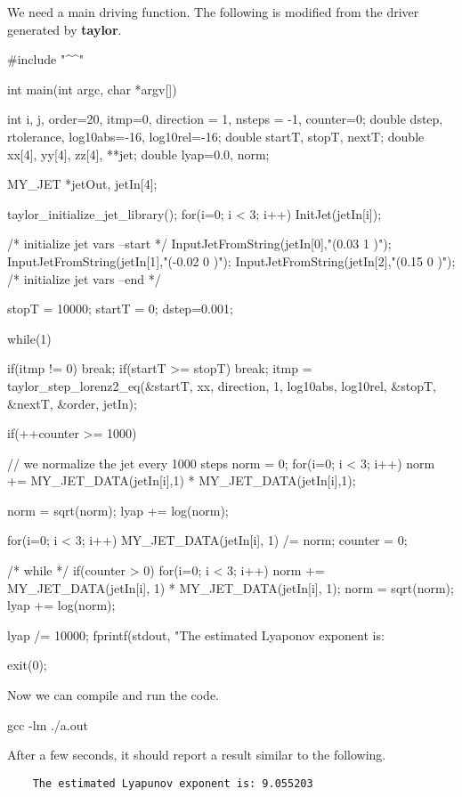 \documentclass[10pt]{article}
\theoremstyle{remark}
\newcommand{\taylorname}{{\bf taylor}}
\newcommand{\mainfile}{}
\newcommand{\odecfile}{}
\newcommand{\odehfile}{}
\begin{document}
\bigskip
We need a main driving function. The following is modified from the
driver generated by \taylorname{}.
\begin{code}[title={File: \mainfile{}}]
    #include "^\odehfile{}^"
    
    int main(int argc, char *argv[])
    {
      int     i, j, order=20, itmp=0, direction = 1, nsteps = -1, counter=0;
      double  dstep, rtolerance, log10abs=-16, log10rel=-16;
      double  startT, stopT, nextT;
      double  xx[4], yy[4], zz[4], **jet;
      double  lyap=0.0, norm;
    
      MY_JET    *jetOut, jetIn[4];
    
      taylor_initialize_jet_library();
      for(i=0; i < 3; i++) InitJet(jetIn[i]);
      
      /* initialize jet vars --start */
      InputJetFromString(jetIn[0],"(0.03  1 )");
      InputJetFromString(jetIn[1],"(-0.02 0 )");
      InputJetFromString(jetIn[2],"(0.15  0 )");
      /* initialize jet vars --end */
    
      stopT = 10000;
      startT = 0;
      dstep=0.001;
    
      while(1)  {
        if(itmp != 0) {break;}
        if(startT >= stopT) { break;}
        itmp = taylor_step_lorenz2_eq(&startT, xx, direction, 1, 
                                      log10abs, log10rel, 
                                      &stopT, &nextT, &order, jetIn);
    
        if(++counter >= 1000) {  // we normalize the jet every 1000 steps                                                                             
          norm = 0;
          for(i=0; i < 3; i++)  norm += MY_JET_DATA(jetIn[i],1) * MY_JET_DATA(jetIn[i],1);  
    
          norm = sqrt(norm);
          lyap += log(norm);
    
          for(i=0; i < 3; i++) MY_JET_DATA(jetIn[i], 1) /= norm;
          counter = 0;
        }
      }  /* while */
      if(counter > 0) {
        for(i=0; i < 3; i++) norm += MY_JET_DATA(jetIn[i], 1) *  MY_JET_DATA(jetIn[i], 1); 
        norm = sqrt(norm);
        lyap += log(norm);
      }
    
      lyap /= 10000;
      fprintf(stdout, "The estimated Lyaponov exponent is: %
    
      exit(0);
    }
\end{code}
Now we can compile and run the code.
\begin{command}
    gcc \mainfile{} \odecfile{} -lm
    ./a.out
\end{command}
After a few seconds, it should report a result similar to the following.
\begin{verbatim}
    The estimated Lyapunov exponent is: 9.055203
\end{verbatim}%
\end{document}
